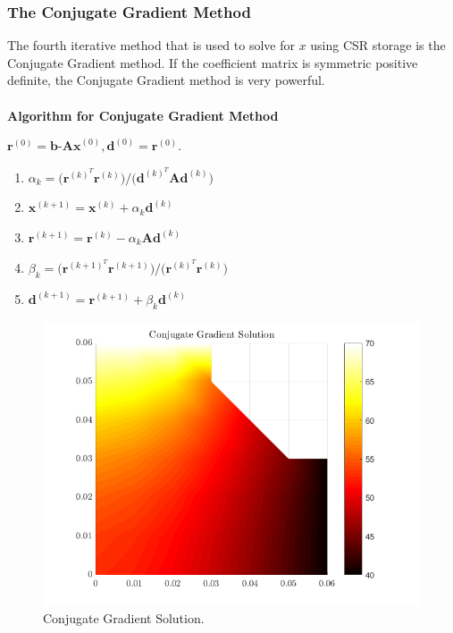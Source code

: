 \documentclass[12pt,a4paper]{article}
\begin{document}
\subsubsection{The Conjugate Gradient Method}
The fourth iterative method that is used to solve for $x$ using CSR storage is the Conjugate Gradient method. If the coefficient matrix is symmetric positive definite, the Conjugate Gradient method is very powerful.
\\\\
\textbf{Algorithm for Conjugate Gradient Method}
\begin{center}
$\textbf{r}^{(0)}=\textbf{b-Ax}^{(0)}, \textbf{d}^{(0)}=\textbf{r}^{(0)}$.
\end{center}
\begin{enumerate}
\item $\alpha_{k} = \big(\textbf{r}^{(k)^{T}}\textbf{r}^{(k)}\big)/\big(\textbf{d}^{(k)^{T}}\textbf{Ad}^{(k)}\big)$
\item $\textbf{x}^{(k+1)}=\textbf{x}^{(k)}+\alpha_{k}\textbf{d}^{(k)}$
\item $\textbf{r}^{(k+1)}=\textbf{r}^{(k)}-\alpha_{k}\textbf{Ad}^{(k)}$
\item $\beta_{k} = \big(\textbf{r}^{(k+1)^{T}}\textbf{r}^{(k+1)}\big)/\big(\textbf{r}^{(k)^{T}}\textbf{r}^{(k)}\big)$
\item $\textbf{d}^{(k+1)}=\textbf{r}^{(k+1)}+\beta_{k}\textbf{d}^{(k)}$
\end{enumerate}

\begin{figure}[H]
	\includegraphics[width=\linewidth]{images/conjugategradientsolution.png}
	\caption{Conjugate Gradient Solution.}
	\label{fig:conjugate}
\end{figure}
\end{document}
